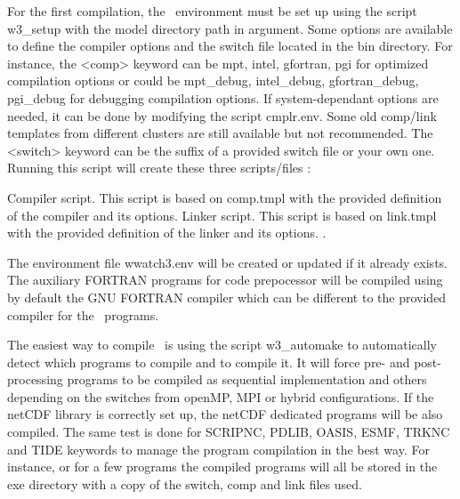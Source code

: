 \vspace{\baselineskip} \noindent 
For the first compilation, the \ws\ environment must be set up using the script
{\file w3\_setup} with the model directory path in argument. Some options are
available to define the compiler options and the switch file located in the
{\dir bin} directory. For instance,  the {\code <comp>} keyword can be {\code mpt}, 
{\code intel}, {\code gfortran}, {\code pgi} for optimized compilation options
or could be {\code mpt\_debug}, {\code intel\_debug}, {\code gfortran\_debug},
{\code pgi\_debug} for debugging compilation options. If system-dependant
options are needed, it can be done by modifying the script {\file cmplr.env}. 
Some old comp/link templates from different clusters are still available but 
not recommended. The {\code <switch>} keyword can be the suffix of a provided
switch file or your own one. Running this script will create these three 
scripts/files :

\begin{flist}
  {Compiler script. This script is based on {\file comp.tmpl} with
	    the provided definition of the compiler and its options.}
  {Linker script. This script is based on {\file link.tmpl} with
	    the provided definition of the linker and its options.}
.
\end{flist}

\vspace{\baselineskip}

The environment file {\file wwatch3.env} will be created or updated if it 
already exists. The auxiliary FORTRAN programs for code prepocessor will be
compiled using by default the GNU FORTRAN compiler which can be different to
the provided compiler for the \ws\ programs.


\vspace{\baselineskip} \noindent 
The easiest way to compile \ws\ is using the script {\file w3\_automake} to 
automatically detect which programs to compile and to compile it. It will
force pre- and post-processing programs to be compiled as sequential 
implementation and others depending on the switches from openMP, MPI or hybrid
configurations. If the netCDF library is correctly set up, the netCDF dedicated
programs will be also compiled. The same test is done for SCRIPNC, PDLIB, OASIS,
ESMF, TRKNC and TIDE keywords to manage the program compilation in the best way.
For instance,  or for a few programs  the compiled programs will all be stored in the 
{\dir exe} directory with a copy of the switch, comp and link files used.

